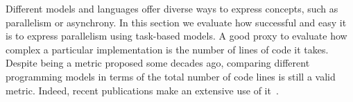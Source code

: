 Different models and languages offer diverse ways to express concepts, such as parallelism or asynchrony.
In this section we evaluate how successful and easy it is to express parallelism using task-based models.  
A good proxy to evaluate how complex a particular implementation is the number of lines of code it takes.
Despite being a metric proposed some decades ago, comparing different programming models in terms of the total number of code lines
is still a valid metric. Indeed, recent publications make an extensive use of it~\cite{Vandierendonck:2011:PPG:2001252.2001265,Dongarra20081}.





